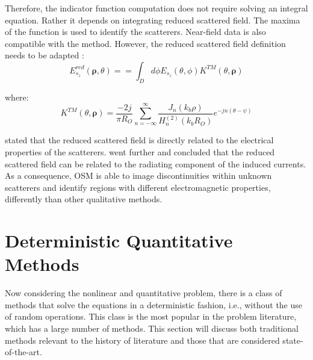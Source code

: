 			Therefore, the indicator function computation does not require solving an integral equation. Rather it depends on integrating reduced scattered field. The maxima of the function is used to identify the scatterers. Near-field data is also compatible with the method. However, the reduced scattered field definition needs to be adapted \citep{akinci2016nearfield}:
			\begin{equation}
				E_{s_z}^{red} (\boldsymbol{\rho}, \theta) = = \int_D d\phi E_{s_z}(\theta, \phi) K^{TM}(\theta, \boldsymbol{\rho}) \label{eq:3:qualitative:osm:nearfield:equation}
			\end{equation}
		
			\noindent where:
			\begin{equation}
				K^{TM}(\theta, \boldsymbol{\rho}) = \frac{-2j}{\pi R_O}\sum\limits_{n=-\infty}^{\infty} \frac{J_n(k_b\rho)}{H_n^{(2)}(k_bR_O)}e^{-jn(\theta-\psi)} \label{eq:3:qualitative:osm:nearfield:indicator}
			\end{equation}
		
			\cite{akinci2016nearfield} stated that the reduced scattered field is directly related to the electrical properties of the scatterers. \cite{bevacqua2020physical} went further and concluded that the reduced scattered field can be related to the radiating component of the induced currents. As a consequence, OSM is able to image discontinuities within unknown scatterers and identify regions with different electromagnetic properties, differently than other qualitative methods.
			
	\section{Deterministic Quantitative Methods}\label{chap:methods:deterministic}
			
		Now considering the nonlinear and quantitative problem, there is a class of methods that solve the equations in a deterministic fashion, i.e., without the use of random operations. This class is the most popular in the problem literature, which has a large number of methods. This section will discuss both traditional methods relevant to the history of literature and those that are considered state-of-the-art.
				
